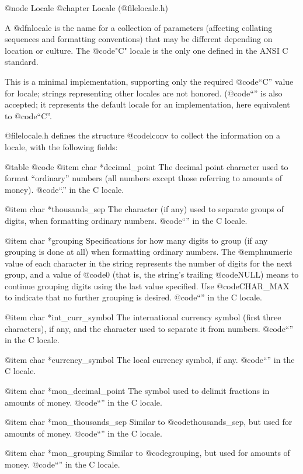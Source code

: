@node Locale
@chapter Locale (@file{locale.h})

A @dfn{locale} is the name for a collection of parameters (affecting
collating sequences and formatting conventions) that may be different
depending on location or culture.  The @code{"C"} locale is the only
one defined in the ANSI C standard.

This is a minimal implementation, supporting only the required @code{``C''}
value for locale; strings representing other locales are not
honored.  (@code{``''} is also accepted; it represents the default locale
for an implementation, here equivalent to  @code{``C''}.


@file{locale.h} defines the structure @code{lconv} to collect the
information on a locale, with the following fields:

@table @code
@item char *decimal_point
The decimal point character used to format ``ordinary'' numbers (all
numbers except those referring to amounts of money).  @code{``.''} in the
C locale. 

@item char *thousands_sep
The character (if any) used to separate groups of digits, when
formatting ordinary numbers.
@code{``''} in the C locale.

@item char *grouping
Specifications for how many digits to group (if any grouping is done at
all) when formatting ordinary numbers.  The @emph{numeric value} of each
character in the string represents the number of digits for the next
group, and a value of @code{0} (that is, the string's trailing
@code{NULL}) means to continue grouping digits using the last value
specified.  Use @code{CHAR_MAX} to indicate that no further grouping is
desired.  @code{``''} in the C locale. 

@item char *int_curr_symbol
The international currency symbol (first three characters), if any, and
the character used to separate it from numbers.
@code{``''} in the C locale.

@item char *currency_symbol
The local currency symbol, if any.
@code{``''} in the C locale.

@item char *mon_decimal_point
The symbol used to delimit fractions in amounts of money.
@code{``''} in the C locale.

@item char *mon_thousands_sep
Similar to @code{thousands_sep}, but used for amounts of money.
@code{``''} in the C locale.

@item char *mon_grouping
Similar to @code{grouping}, but used for amounts of money.
@code{``''} in the C locale.

